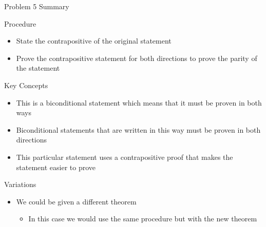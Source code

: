 \begin{summary}{Problem 5 Summary}
    \begin{statement}{Procedure}
        \begin{itemize}
            \item State the contrapositive of the original statement
            \item Prove the contrapositive statement for both directions to prove the parity of the statement
        \end{itemize}
    \end{statement}
    \begin{statement}{Key Concepts}
        \begin{itemize}
            \item This is a biconditional statement which means that it must be proven in both ways
            \item Biconditional statements that are written in this way must be proven in both directions
            \item This particular statement uses a contrapositive proof that makes the statement easier to prove
        \end{itemize}
    \end{statement}
    \begin{statement}{Variations}
        \begin{itemize}
            \item We could be given a different theorem
            \begin{itemize}
                \item In this case we would use the same procedure but with the new theorem
            \end{itemize}
        \end{itemize}
    \end{statement}
\end{summary}

